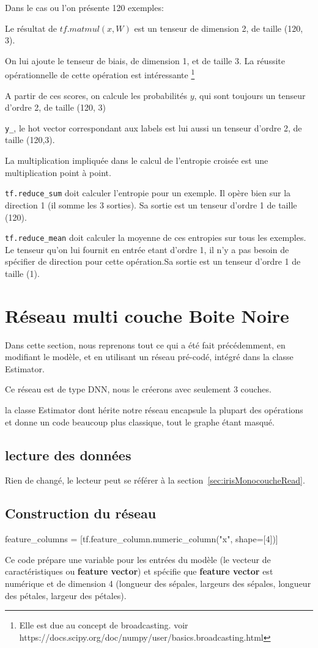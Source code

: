 \documentclass[a4paper,11pt]{book}
\begin{document}
Dans le cas ou l'on présente 120 exemples:

Le résultat de $tf.matmul(x,W)$ est un tenseur de dimension 2, de taille (120, 3).

On lui ajoute le tenseur de biais, de dimension 1, et de taille 3. La réussite opérationnelle de cette opération est intéressante \footnote{ Elle est due au concept de broadcasting. voir https://docs.scipy.org/doc/numpy/user/basics.broadcasting.html }

A partir de ces scores, on calcule les probabilités $y$, qui sont toujours un tenseur d'ordre 2, de taille (120, 3)

\verb+y_+, le hot vector correspondant aux labels est lui aussi un tenseur d'ordre 2, de taille (120,3).

La multiplication impliquée dans le calcul de l'entropie croisée est une multiplication point à point.

\verb+tf.reduce_sum+ doit calculer l'entropie pour un exemple. Il opère bien sur la direction 1 (il somme les 3 sorties). Sa sortie est un tenseur d'ordre 1 de taille (120).

\verb+tf.reduce_mean+ doit calculer la moyenne de ces entropies sur tous les exemples. Le tenseur qu'on lui fournit en entrée etant d'ordre 1, il n'y a pas besoin de spécifier de direction pour cette opération.Sa sortie est un tenseur d'ordre 1 de taille (1).


\section{Réseau multi couche Boite Noire }
Dans cette section, nous reprenons tout ce qui a été fait précédemment, en modifiant le modèle, et en utilisant un réseau pré-codé, intégré dans la classe Estimator.

Ce réseau est de type DNN, nous le créerons avec seulement 3 couches.

la classe Estimator dont hérite notre réseau encapsule la plupart des opérations et donne un code beaucoup plus classique, tout le graphe étant masqué. 

\subsection{lecture des données}
Rien de changé, le lecteur peut se référer à la
section~\ref{sec:irisMonocoucheRead}.

\subsection{Construction du réseau}
\label{sec:irisMulticoucheBuild}
\begin{mypython}
feature_columns = [tf.feature_column.numeric_column("x", shape=[4])]
\end{mypython}
Ce code prépare une variable pour les entrées du modèle (le vecteur de caractéristiques ou \textbf{feature vector}) et spécifie que \textbf{feature vector} est numérique et de dimension 4 (longueur des sépales, largeurs des sépales, longueur des pétales, largeur des pétales).
\end{document}
